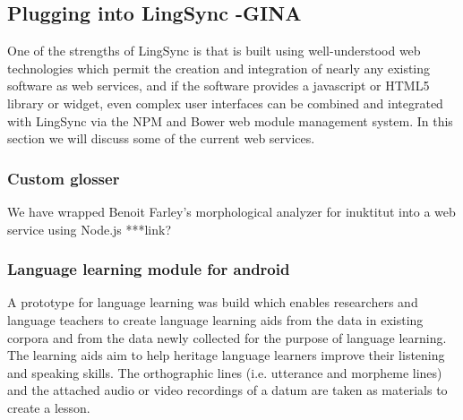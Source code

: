 \documentclass[letterpaper, 12pt, dvips]{mitwpl}
\begin{document}
\subsection{Plugging into LingSync -GINA}

One of the strengths of LingSync is that is built using well-understood web technologies which permit the creation and integration of nearly any existing software as web services, and if the software provides a javascript or HTML5 library or widget, even complex user interfaces can be combined and integrated with LingSync via the NPM and Bower web module management system. In this section we will discuss some of the current web services.



\subsubsection{Custom glosser}

We have wrapped Benoit Farley's morphological analyzer for inuktitut into a web service using Node.js ***link?

\subsubsection{Language learning module for android}

A prototype for language learning was build which  enables researchers and language teachers to create language learning aids from the data in existing corpora and from the data newly collected for the purpose of language learning. The learning aids aim to help heritage language learners improve their listening and speaking skills. The orthographic lines (i.e. utterance and morpheme lines) and the attached audio or video recordings of a datum are taken as materials to create a lesson. 
\end{document}
